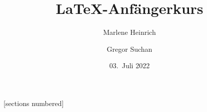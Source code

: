 \usepackage{fontspec}

\usepackage{appendixnumberbeamer}

[sections numbered]

\author{Marlene Heinrich\and Gregor Suchan}
\title{\LaTeX{}-Anfängerkurs}
\date{03.~Juli 2022}

\usepackage[ngerman]{babel}

\usepackage{booktabs}

\usepackage{amsmath,amssymb,dsfont,mathtools,amsthm}

\usepackage{csquotes}

\usepackage[locale=DE, separate-uncertainty=true]{siunitx}

\usepackage[date=year, isbn=false, doi=false, url=false, eprint=false]{biblatex}


\usepackage{graphicx}

\usepackage{tikz}

\usepackage{soul}
